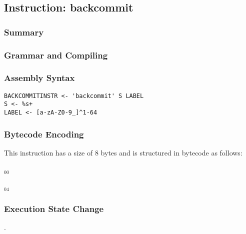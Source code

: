 \subsection{Instruction: backcommit}

\subsubsection{Summary}


\subsubsection{Grammar and Compiling}


\subsubsection{Assembly Syntax}

\begin{myquote}
\begin{verbatim}
BACKCOMMITINSTR <- 'backcommit' S LABEL
S <- %s+
LABEL <- [a-zA-Z0-9_]^1-64
\end{verbatim}
\end{myquote}


\subsubsection{Bytecode Encoding}

This instruction has a size of 8 bytes and is structured in bytecode as follows:

$_{00}$\ 



$_{04}$\ 


\subsubsection{Execution State Change}

.


